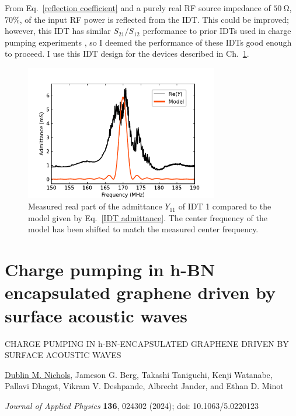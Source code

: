 \documentclass{beavtex_dub_edit}
\begin{document}
From Eq.\ \ref{reflection coefficient} and a purely real RF source impedance of $\SI{50}{\ohm}$, $70\%$, of the input RF power is reflected from the IDT. This could be improved; however, this IDT has similar $S_{21}/S_{12}$ performance to prior IDTs used in charge pumping experiments \cite{buitelaar_charge_2006}, so I deemed the performance of these IDTs good enough to proceed. I use this IDT design for the devices described in Ch.\ \ref{AE charge pumping paper}.

\begin{figure}
    \includegraphics[width = 0.75\textwidth]{Z11_plot_.pdf}
    \caption{Measured real part of the admittance $Y_{11}$ of IDT 1 compared to the model given by Eq.\ \ref{IDT admittance}. The center frequency of the model has been shifted to match the measured center frequency.}
    \label{Z11 plot}
\end{figure}

\chapter[Charge pumping in h-BN encapsulated graphene driven by surface acoustic waves][Charge pumping in h-BN encapsulated graphene]{Charge pumping in h-BN encapsulated graphene driven by surface acoustic waves}\label{AE charge pumping paper}

\clearpage

\thispagestyle{empty}
\mbox{}
\vspace{3cm}
\begin{center}
    {\large CHARGE PUMPING IN h-BN-ENCAPSULATED GRAPHENE DRIVEN BY SURFACE ACOUSTIC WAVES}
    \vspace{4cm}

    \underline{Dublin M. Nichols}, Jameson G. Berg, Takashi Taniguchi, Kenji Watanabe, Pallavi Dhagat, Vikram V. Deshpande, Albrecht Jander, and Ethan D. Minot
    \vspace{3cm}

    \textit{Journal of Applied Physics} \textbf{136}, 024302 (2024); doi: 10.1063/5.0220123
\end{center}
\end{document}

